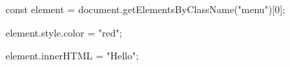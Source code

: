 const element = document.getElementsByClassName("menu")[0];

element.style.color = "red";

element.innerHTML = "Hello";